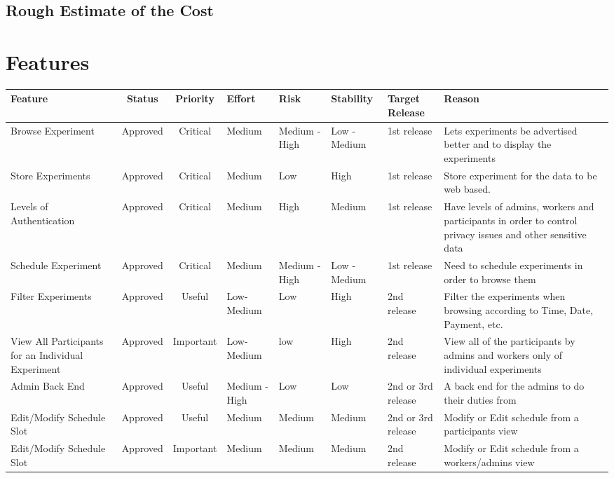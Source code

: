 \documentclass{article}
\begin{document}
\subsection{Rough Estimate of the Cost}
\section{Features}
\begin{table}[!hb]\footnotesize
    \begin{tabular}{|p{2.5cm}|c|c|p{1.25cm}|p{1.5cm}|p{1.5cm}|p{1.25cm}|p{3.25cm}|}
        \hline
        Feature & Status & Priority & Effort & Risk  & Stability & Target Release & Reason \\
        \hline
        Browse Experiment & Approved & Critical & Medium & Medium - High & Low - Medium & 1st release & Lets experiments be advertised better and to display the experiments \\
        \hline
        Store Experiments & Approved & Critical & Medium & Low   & High  & 1st release & Store experiment for the data to be web based. \\
        \hline
        Levels of Authentication & Approved & Critical & Medium & High  & Medium & 1st release  & Have levels of admins, workers and participants in order to control privacy issues and other sensitive data \\
        \hline
        Schedule Experiment & Approved & Critical & Medium & Medium - High & Low - Medium & 1st release   & Need to schedule experiments in order to browse them \\
        \hline
        Filter Experiments & Approved & Useful & Low-Medium & Low   & High  & 2nd release & Filter the experiments when browsing according to Time, Date, Payment, etc. \\
        \hline
        View All Participants for an Individual Experiment & Approved & Important & Low-Medium & low   & High  & 2nd release  & View all of the participants by admins and workers only of individual experiments \\
        \hline
        Admin Back End & Approved & Useful & Medium - High & Low   & Low   & 2nd or 3rd release  & A back end for the admins to do their duties from \\
        \hline
        Edit/Modify Schedule Slot & Approved & Useful & Medium & Medium & Medium & 2nd or 3rd release   & Modify or Edit schedule from a participants view \\
        \hline
        Edit/Modify Schedule Slot & Approved & Important & Medium & Medium & Medium & 2nd release  & Modify or Edit schedule from a workers/admins view \\

\end{tabular}
\end{table}
\end{document}
